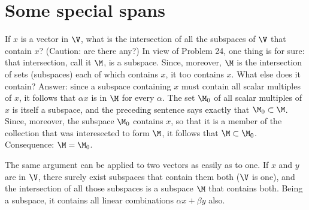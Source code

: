 \section{Some special spans}

If $x$ is a vector in $\V$, what is the intersection of all the subspaces of $\V$ that contain $x$? (Caution: are there any?) In view of Problem 24, one thing is for sure: that intersection, call it $\M$, is a subspace. Since, moreover, $\M$ is the intersection of sets (subspaces) each of which contains $x$, it too contains $x$. What else does it contain? Answer: since a subspace containing $x$ must contain all scalar multiples of $x$, it follows that $\alpha x$ is in $\M$ for every $\alpha$. The set $\M_0$ of all scalar multiples of $x$ is itself a subspace, and the preceding sentence says exactly that $\M_0 \subset \M$. Since, moreover, the subspace $\M_0$ contains $x$, so that it is a member of the collection that was interesected to form $\M$, it follows that $\M \subset \M_0$. Consequence: $\M = \M_0$.

The same argument can be applied to two vectors as easily as to one. If $x$ and $y$ are in $\V$, there surely exist subspaces that contain them both ($\V$ is one), and the intersection of all those subspaces is a subspace $\M$ that contains both. Being a subspace, it contains all linear combinations $\alpha x + \beta y$ also.